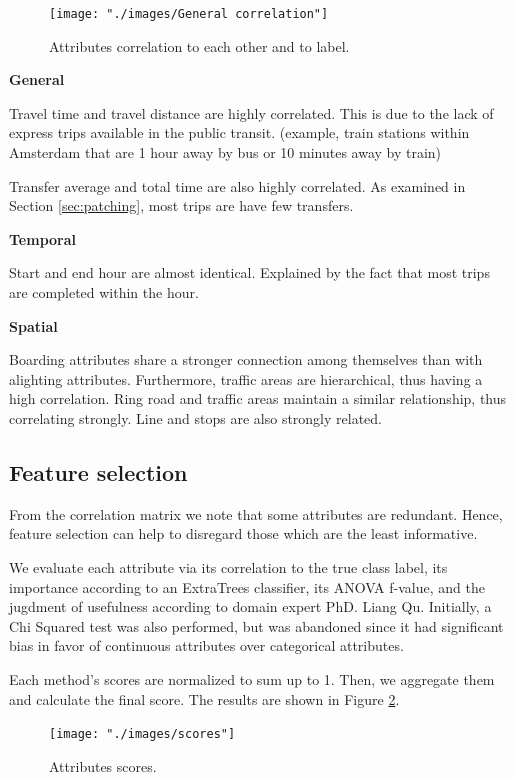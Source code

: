 \documentclass{article}
\begin{document}
\begin{figure}[H]
  \centering
  \texttt{[image: "./images/General correlation"]}
  \caption{Attributes correlation to each other and to label.}
  \label{fig:classification/correlation}
\end{figure}

\textbf{General}

Travel time and travel distance are highly correlated. This is due to the lack of express trips available in the public transit. (example, train stations within Amsterdam that are 1 hour away by bus or 10 minutes away by train)

Transfer average and total time are also highly correlated. As examined in Section \ref{sec:patching}, most trips are have few transfers. 

\textbf{Temporal}

Start and end hour are almost identical. Explained by the fact that most trips are completed within the hour. 

\textbf{Spatial}

Boarding attributes share a stronger connection among themselves than with alighting attributes. Furthermore, traffic areas are hierarchical, thus having a high correlation. Ring road and traffic areas maintain a similar relationship, thus correlating strongly. Line and stops are also strongly related. 

\subsection{Feature selection}
From the correlation matrix we note that some attributes are redundant. Hence, feature selection can help to disregard those which are the least informative. 


We evaluate each attribute via its correlation to the true class label, its importance according to an ExtraTrees classifier, its ANOVA f-value, and the jugdment of usefulness according to domain expert PhD. Liang Qu. Initially, a Chi Squared test was also performed, but was abandoned since it had significant bias in favor of continuous attributes over categorical attributes. 

Each method's scores are normalized to sum up to 1. Then, we aggregate them and calculate the final score. The results are shown in Figure \ref{fig:classification/scores}. 

\begin{figure}[H]
  \centering
  \texttt{[image: "./images/scores"]}
  \caption{Attributes scores.}
  \label{fig:classification/scores}
\end{figure}
\end{document}

